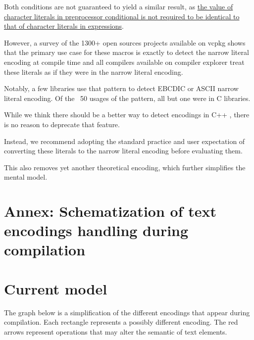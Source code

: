 \documentclass{wg21}
\begin{document}
Both conditions are not guaranteed to yield a similar result, as \href{http://eel.is/c++draft/cpp#cond-12}{the value of character literals in preprocessor conditional is not required to be identical to that of character literals in expressions}.

However, a survey of the 1300+ open sources projects available on vcpkg shows that the primary use case for these macros is exactly to detect the
narrow literal encoding at compile time and all compilers available on compiler explorer treat these literals as if they were in the narrow literal encoding.

Notably, a few libraries use that pattern to detect EBCDIC or ASCII narrow literal encoding.
Of the ~50 usages of the pattern, all but one were in C libraries.

While we think there should be a better way to detect encodings in C++ \cite{P1885R2}, there is no reason to deprecate that feature.

Instead, we recommend adopting the standard practice and user expectation of converting these literals to the narrow literal encoding before evaluating them.

This also removes yet another theoretical encoding, which further simplifies the mental model.

\pagebreak

\section{Annex: Schematization of text encodings handling during compilation}
\section{Current model}

The graph below is a simplification of the different encodings that appear during compilation.
Each rectangle represents a possibly different encoding.
The red arrows represent operations that may alter the semantic of text elements.

\end{document}
